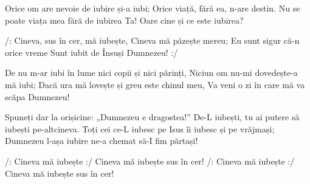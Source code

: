 \beginverse
Orice om are nevoie de iubire și-a iubi;
Orice viață, fără ea, n-are destin.
Nu se poate viața mea fără de iubirea Ta!
Oare cine și ce este iubirea?
\endverse

\beginchorus
/: Cineva, sus în cer, mă iubește,
Cineva mă păzește mereu;
Eu sunt sigur că-n orice vreme
Sunt iubit de Însuși Dumnezeu! :/
\endchorus

\beginverse
De nu m-ar iubi în lume nici copii și nici părinți,
Niciun om nu-mi dovedește-a mă iubi;
Dacă ura mă lovește și greu este chinul meu,
Va veni o zi în care mă va scăpa Dumnezeu!
\endverse

\beginverse
Spuneți dar la orișicine: „Dumnezeu e dragostea!”
De-L iubești, tu ai putere să iubești pe-altcineva.
Toți cei ce-L iubesc pe Isus îi iubesc și pe vrăjmași;
Dumnezeu l-așa iubire ne-a chemat să-I fim părtași!
\endverse

\beginverse*
/: Cineva mă iubește :/
Cineva mă iubește sus în cer!
/: Cineva mă iubește :/
Cineva mă iubește sus în cer!
\endverse
\endsong